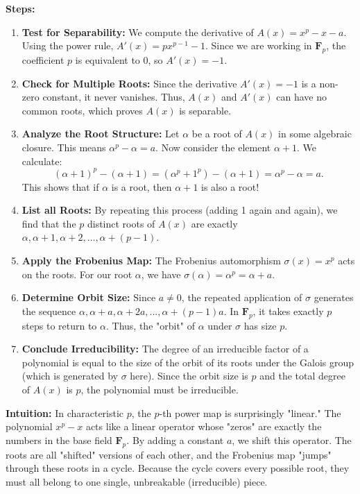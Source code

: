 \begin{solution}
\textbf{Steps:}
\begin{enumerate}
    \item \textbf{Test for Separability:} We compute the derivative of $A(x) = x^p - x - a$. Using the power rule, $A'(x) = px^{p-1} - 1$. Since we are working in $\mathbf{F}_p$, the coefficient $p$ is equivalent to $0$, so $A'(x) = -1$.
    \item \textbf{Check for Multiple Roots:} Since the derivative $A'(x) = -1$ is a non-zero constant, it never vanishes. Thus, $A(x)$ and $A'(x)$ can have no common roots, which proves $A(x)$ is separable.
    \item \textbf{Analyze the Root Structure:} Let $\alpha$ be a root of $A(x)$ in some algebraic closure. This means $\alpha^p - \alpha = a$. Now consider the element $\alpha + 1$. We calculate:
    $$(\alpha+1)^p - (\alpha+1) = (\alpha^p + 1^p) - (\alpha + 1) = \alpha^p - \alpha = a.$$
    This shows that if $\alpha$ is a root, then $\alpha + 1$ is also a root!
    \item \textbf{List all Roots:} By repeating this process (adding 1 again and again), we find that the $p$ distinct roots of $A(x)$ are exactly $\alpha, \alpha+1, \alpha+2, \dots, \alpha+(p-1)$.
    \item \textbf{Apply the Frobenius Map:} The Frobenius automorphism $\sigma(x) = x^p$ acts on the roots. For our root $\alpha$, we have $\sigma(\alpha) = \alpha^p = \alpha + a$.
    \item \textbf{Determine Orbit Size:} Since $a \neq 0$, the repeated application of $\sigma$ generates the sequence $\alpha, \alpha+a, \alpha+2a, \dots, \alpha+(p-1)a$. In $\mathbf{F}_p$, it takes exactly $p$ steps to return to $\alpha$. Thus, the "orbit" of $\alpha$ under $\sigma$ has size $p$.
    \item \textbf{Conclude Irreducibility:} The degree of an irreducible factor of a polynomial is equal to the size of the orbit of its roots under the Galois group (which is generated by $\sigma$ here). Since the orbit size is $p$ and the total degree of $A(x)$ is $p$, the polynomial must be irreducible.
\end{enumerate}

\textbf{Intuition:}
In characteristic $p$, the $p$-th power map is surprisingly "linear." The polynomial $x^p - x$ acts like a linear operator whose "zeros" are exactly the numbers in the base field $\mathbf{F}_p$. By adding a constant $a$, we shift this operator. The roots are all "shifted" versions of each other, and the Frobenius map "jumps" through these roots in a cycle. Because the cycle covers every possible root, they must all belong to one single, unbreakable (irreducible) piece.
\end{solution}

